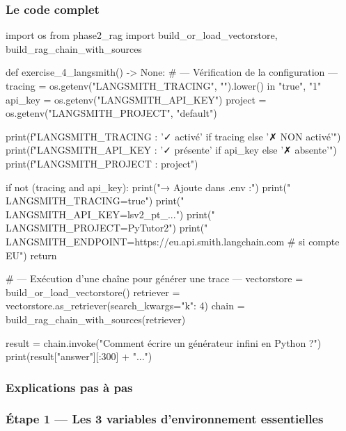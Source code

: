 \documentclass[11pt,a4paper]{article}
\begin{document}
\subsubsection{Le code complet}

\begin{pythoncode}
import os
from phase2_rag import build_or_load_vectorstore, build_rag_chain_with_sources


def exercise_4_langsmith() -> None:
    # --- Vérification de la configuration ---
    tracing = os.getenv("LANGSMITH_TRACING", "").lower() in {"true", "1"}
    api_key = os.getenv("LANGSMITH_API_KEY")
    project = os.getenv("LANGSMITH_PROJECT", "default")

    print(f"LANGSMITH_TRACING : {'✓ activé' if tracing else '✗ NON activé'}")
    print(f"LANGSMITH_API_KEY : {'✓ présente' if api_key else '✗ absente'}")
    print(f"LANGSMITH_PROJECT : {project}")

    if not (tracing and api_key):
        print("→ Ajoute dans .env :")
        print("    LANGSMITH_TRACING=true")
        print("    LANGSMITH_API_KEY=lsv2_pt_...")
        print("    LANGSMITH_PROJECT=PyTutor2")
        print("    LANGSMITH_ENDPOINT=https://eu.api.smith.langchain.com  # si compte EU")
        return

    # --- Exécution d'une chaîne pour générer une trace ---
    vectorstore = build_or_load_vectorstore()
    retriever   = vectorstore.as_retriever(search_kwargs={"k": 4})
    chain       = build_rag_chain_with_sources(retriever)

    result = chain.invoke("Comment écrire un générateur infini en Python ?")
    print(result["answer"][:300] + "...")
\end{pythoncode}

\subsubsection{Explications pas à pas}

\subsubsection*{Étape 1 — Les 3 variables d'environnement essentielles}
\end{document}
